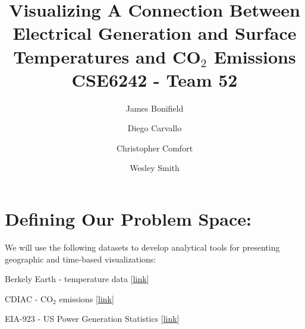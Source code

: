 \documentclass[sigconf,nonacm=true]{acmart}
\newenvironment{my_enumerate}{
	\begin{enumerate}
		\setlength{\itemsep}{0pt}
		\setlength{\parskip}{0pt}
		\setlength{\parsep}{0pt}}
	{\end{enumerate}
}
\begin{document}
%
\title{Visualizing A Connection Between Electrical Generation and Surface Temperatures and CO$_2$ Emissions \\ CSE6242 - Team 52}

%


\author{James Bonifield}
\affiliation{\institution{}}

\author{Diego Carvallo}
\affiliation{\institution{}}

\author{Christopher Comfort}
\affiliation{\institution{}}

\author{Wesley Smith}
\affiliation{\institution{}}

\maketitle
\section{Defining Our Problem Space:}
We will use the following datasets to develop analytical tools for presenting geographic and time-based visualizations:
\begin{my_enumerate}
	\item Berkely Earth - temperature data \cite{Berkeley_Earth_temp_rohde2013berkeley} [\href{http://berkeleyearth.org/data/}{\color{blue}link}]
	\item CDIAC - CO$_2$ emissions \cite{Foosil_fuel_burning_andres1997geographic}
	 [\href{https://cdiac.ess-dive.lbl.gov/epubs/ndp/ndp058/ndp058_v2016.html}{\color{blue}link}]
	\item EIA-923 - US Power Generation Statistics [\href{https://www.eia.gov/electricity/data/eia923/}{\color{blue}link}]
\end{my_enumerate}
\end{document}
